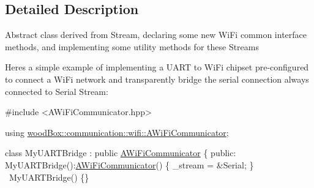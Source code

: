\subsection{Detailed Description}
Abstract class derived from Stream, declaring some new Wi\+Fi common interface methods, and implementing some utility methods for these {\ttfamily Stream}s

Here\textquotesingle{}s a simple example of implementing a U\+A\+RT to Wi\+Fi chipset pre-\/configured to connect a Wi\+Fi network and transparently bridge the serial connection always connected to Serial Stream\+:


\begin{DoxyCode}
\textcolor{preprocessor}{#include <AWiFiCommunicator.hpp>}

\textcolor{keyword}{using} \mbox{\hyperlink{classwood_box_1_1communication_1_1wifi_1_1_a_wi_fi_communicator}{woodBox::communication::wifi::AWiFiCommunicator}};

\textcolor{keyword}{class }MyUARTBridge : \textcolor{keyword}{public} \mbox{\hyperlink{classwood_box_1_1communication_1_1wifi_1_1_a_wi_fi_communicator_a9d1dc13ca9243170b04211bef2b86ed2}{AWiFiCommunicator}} \{
  \textcolor{keyword}{public}:
    MyUARTBridge():\mbox{\hyperlink{classwood_box_1_1communication_1_1wifi_1_1_a_wi_fi_communicator_a9d1dc13ca9243170b04211bef2b86ed2}{AWiFiCommunicator}}() \{
      \_stream = &Serial;
    \}
    ~MyUARTBridge() \{\}


\end{DoxyCode}
